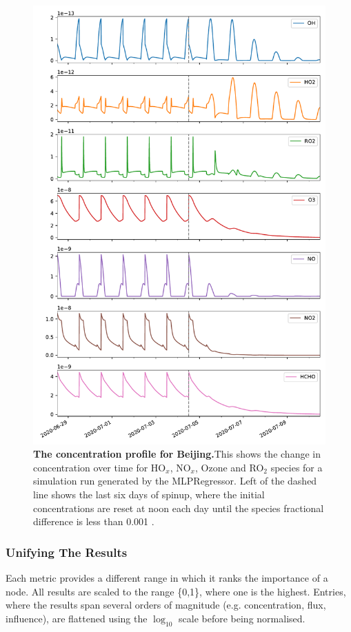 \newpage


\begin{figure}[H]
    \centering
\includegraphics[width=.9\textwidth]{figures_c3/mlpregressor/conc_beijing.pdf}
\caption{\textbf{The concentration profile for Beijing.}This shows the change in concentration over time for HO$_x$, NO$_x$, Ozone and RO$_2$ species for a simulation run generated by the MLPRegressor. Left of the dashed line shows the last six days of spinup, where the initial concentrations are reset at noon each day until the species fractional difference is less than 0.001 .}\label{fig:cbeijing}
\end{figure}

\newpage





\subsubsection{Unifying The Results}
Each metric provides a different range in which it ranks the importance of a node. All results are scaled to the range \{0,1\}, where one is the highest. Entries, where the results span several orders of magnitude (e.g. concentration, flux, influence), are flattened using the $\log_{10}$ scale before being normalised.



